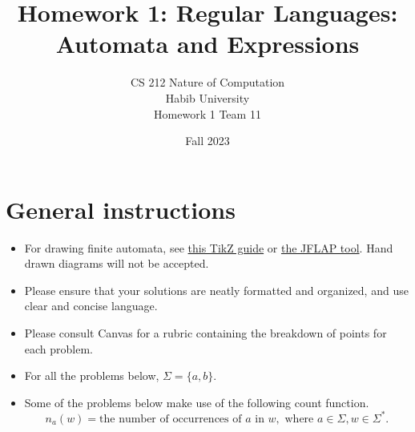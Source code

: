 \documentclass[addpoints]{exam}
\title{Homework 1: Regular Languages: Automata and Expressions}
\author{CS 212 Nature of Computation\\Habib University\\Homework 1 Team 11}
\date{Fall 2023}
\begin{document}
\maketitle

\section*{General instructions}
\begin{itemize}
\item For drawing finite automata, see  \href{https://www3.nd.edu/~kogge/courses/cse30151-fa17/Public/other/tikz_tutorial.pdf}{this TikZ guide} or \href{https://www.jflap.org}{the JFLAP tool}. Hand drawn diagrams will not be accepted.
\item Please ensure that your solutions are neatly formatted and organized, and use clear and
concise language.
\item Please consult Canvas for a rubric containing the breakdown of points for each problem.
\item For all the problems below, $\Sigma=\{a,b\}$.
\item Some of the problems below make use of the following count function.
\[
    n_a(w) =  \text{the number of occurrences of } a\text{ in } w, \text{ where } a\in\Sigma,w\in\Sigma^*.
\]
\end{itemize}
\end{document}
